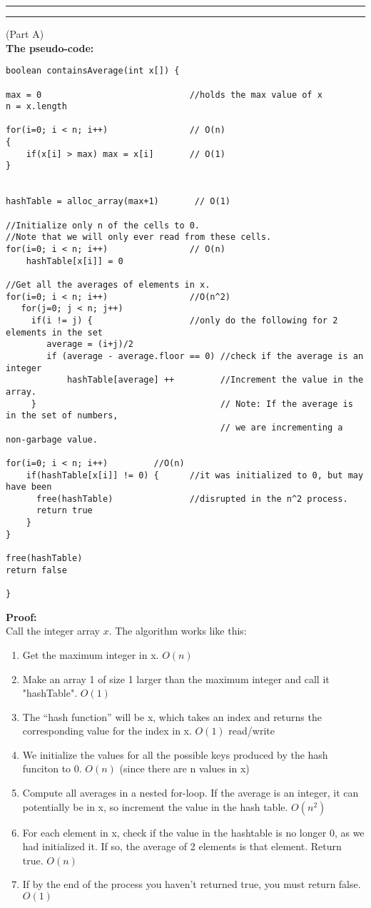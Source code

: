 \documentclass[11pt]{article}
\newcounter{questionCounter}
\newcounter{partCounter}[questionCounter]
\newenvironment{question}[2][\arabic{questionCounter}]{%
    \setcounter{partCounter}{0}%
    \vspace{.25in} \hrule \vspace{0.5em}%
        \noindent{\bf #2}%
    \vspace{0.8em} \hrule \vspace{.10in}%
    \addtocounter{questionCounter}{1}%
}{}
\begin{document}
\begin{question}{Off with Their Heads}
(Part A)\\
\textbf{The pseudo-code:}
\begin{verbatim}
boolean containsAverage(int x[]) {

max = 0                             //holds the max value of x
n = x.length
   
for(i=0; i < n; i++)                // O(n)
{
    if(x[i] > max) max = x[i]       // O(1)
}


hashTable = alloc_array(max+1)       // O(1)

//Initialize only n of the cells to 0.
//Note that we will only ever read from these cells.
for(i=0; i < n; i++)                // O(n)
    hashTable[x[i]] = 0
  
//Get all the averages of elements in x.
for(i=0; i < n; i++)                //O(n^2)
   for(j=0; j < n; j++)
     if(i != j) {                   //only do the following for 2 elements in the set
        average = (i+j)/2
        if (average - average.floor == 0) //check if the average is an integer
            hashTable[average] ++         //Increment the value in the array. 
     }                                    // Note: If the average is in the set of numbers,
                                          // we are incrementing a non-garbage value.      

for(i=0; i < n; i++)         //O(n)
    if(hashTable[x[i]] != 0) {      //it was initialized to 0, but may have been
      free(hashTable)               //disrupted in the n^2 process.
      return true
    }
}

free(hashTable)
return false

}
\end{verbatim}
\textbf{Proof:}\\
Call the integer array $x$. The algorithm works like this:
\begin{enumerate}
\item Get the maximum integer in x. $O(n)$
\item Make an array 1 of size 1 larger than the maximum integer and call it "hashTable". $O(1)$
\item The ``hash function'' will be x, which takes an index
      and returns the corresponding value for the index in x. $O(1)$ read/write
\item We initialize the values for all the possible keys produced
      by the hash funciton to 0. $O(n)$ (since there are n values in x)
\item Compute all averages in a nested for-loop. If the average is an integer,
it can potentially be in x, so increment the value in the hash table. $O(n^2)$
\item For each element in x, check if the value in the hashtable is no longer
0, as we had initialized it. If so, the average of 2 elements is that element. 
Return true. $O(n)$
\item If by the end of the process you haven't returned true, you must return false. $O(1)$
\end{enumerate}


\end{question}
\end{document}
